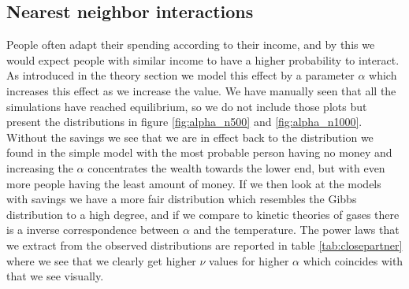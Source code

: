 \documentclass[a4paper,11pt]{article}
\begin{document}
{\subsection{Nearest neighbor interactions}
People often adapt their spending according to their income, and by this we would expect people with similar income to have a higher probability to interact. As introduced in the theory section we model this effect by a parameter $\alpha$ which increases this effect as we increase the value. We have manually seen that all the simulations have reached equilibrium, so we do not include those plots but present the distributions in figure \ref{fig:alpha_n500} and \ref{fig:alpha_n1000}. Without the savings we see that we are in effect back to the distribution we found in the simple model with the most probable person having no money and increasing the $\alpha$ concentrates the wealth towards the lower end, but with even more people having the least amount of money. If we then look at the models with savings we have a more fair distribution which resembles the Gibbs distribution to a high degree, and if we compare to kinetic theories of gases there is a inverse correspondence between $\alpha$ and the temperature. The power laws that we extract from the observed distributions are reported in table \ref{tab:closepartner} where we see that we clearly get higher $\nu$ values for higher $\alpha$ which coincides with that we see visually. 

}
\end{document}
